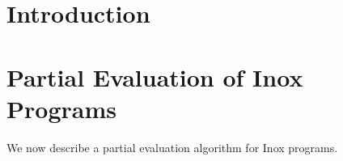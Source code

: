 

\clearpage
\pagestyle{mystyle}

\section{Introduction}


%
%
%
%
%

\clearpage

\section{Partial Evaluation of Inox Programs}
\label{partial}


We now describe a partial evaluation algorithm for Inox programs.

